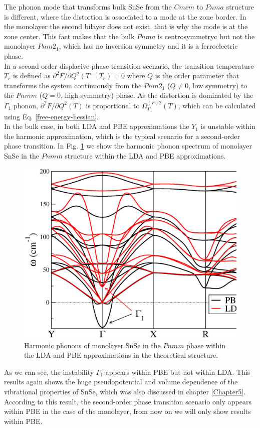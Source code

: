 The phonon mode that transforms bulk SnSe from the $Cmcm$ to $Pnma$ structure is different, where the distortion is 
associated to a mode at the zone border. In the monolayer the second bilayer does not exist, that is why the mode is 
at the zone center. This fact makes that the bulk $Pnma$ is centrosymmetryc but not the monolayer $Pnm2_{1}$, which 
has no inversion symmetry and it is a ferroelectric phase. \\

In a second-order displacive phase transition scenario, the transition temperature $T_{c}$ is defined as 
$\partial^{2}F/\partial Q^{2}(T=T_{c})=0$ where $Q$ is the order parameter that transforms the system continuously 
from the $Pnm2_{1}$ ($Q\ne0$, low symmetry) to the $Pnmm$ ($Q=0$, high symmetry) phase. As the distortion is 
dominated by the $\Gamma_{1}$ phonon, $\partial^{2}F/\partial Q^{2}(T)$ is proportional to 
$\Omega^{(F)2}_{\Gamma_{1}}(T)$, which can be calculated using Eq. \ref{free-energy-hessian}. \\

In the bulk case, in both LDA and PBE approximations the $Y_{1}$ is unstable within the harmonic approximation, 
which is the typical scenario for a second-order phase transition. In Fig. \ref{harmonic-mono} we show the 
harmonic phonon spectrum of monolayer SnSe in the $Pnmm$ structure within the LDA and PBE approximations. 
\begin{figure}[h]
\includegraphics[width=\linewidth]{Figures/harmonic-mono.eps}
\caption[Harmonic phonons of monolayer SnSe.]{Harmonic phonons of monolayer SnSe in the $Pnmm$ phase within the LDA 
and PBE approximations in the theoretical structure.}
\label{harmonic-mono}
\end{figure}
As we can see, the instability $\Gamma_{1}$ appears within PBE but not within LDA. This results again shows the huge 
pseudopotential and volume dependence of the vibrational properties of SnSe, which was also discussed in 
chapter \ref{Chapter5}. According to this result, the second-order phase transition scenario only appears within PBE 
in the case of the monolayer, from now on we will only show results within PBE. \\

